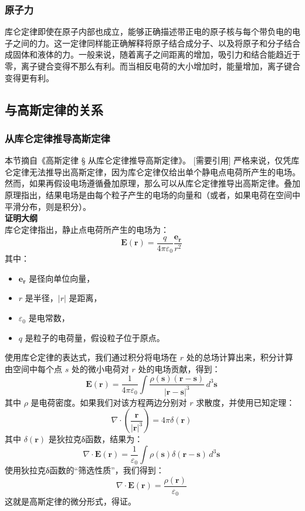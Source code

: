 \subsubsection{原子力}    
库仑定律即使在原子内部也成立，能够正确描述带正电的原子核与每个带负电的电子之间的力。这一定律同样能正确解释将原子结合成分子、以及将原子和分子结合成固体和液体的力。一般来说，随着离子之间距离的增加，吸引力和结合能趋近于零，离子键合变得不那么有利。而当相反电荷的大小增加时，能量增加，离子键合变得更有利。
\subsection{与高斯定律的关系}
\subsubsection{从库仑定律推导高斯定律}  
本节摘自《高斯定律 § 从库仑定律推导高斯定律》。  
[需要引用] 严格来说，仅凭库仑定律无法推导出高斯定律，因为库仑定律仅给出单个静电点电荷所产生的电场。然而，如果再假设电场遵循叠加原理，那么可以从库仑定律推导出高斯定律。叠加原理指出，结果电场是由每个粒子产生的电场的向量和（或者，如果电荷在空间中平滑分布，则是积分）。\\
\textbf{证明大纲}\\
库仑定律指出，静止点电荷所产生的电场为：
\[
\mathbf{E}(\mathbf{r}) = \frac{q}{4 \pi \varepsilon_0} \frac{\mathbf{e_r}}{r^2}~
\]
其中：
\begin{itemize}
\item \(\mathbf{e_r}\) 是径向单位向量，
\item \(r\) 是半径，\(|r|\) 是距离，
\item \(\varepsilon_0\) 是电常数，
\item \(q\) 是粒子的电荷量，假设粒子位于原点。
\end{itemize}
使用库仑定律的表达式，我们通过积分将电场在 \(r\) 处的总场计算出来，积分计算由空间中每个点 \(s\) 处的微小电荷对 \(r\) 处的电场贡献，得到：
\[
\mathbf{E}(\mathbf{r}) = \frac{1}{4 \pi \varepsilon_0} \int \frac{\rho (\mathbf{s}) (\mathbf{r} - \mathbf{s})}{|\mathbf{r} - \mathbf{s}|^3} \, d^3\mathbf{s}~
\]
其中 \(\rho\) 是电荷密度。如果我们对该方程两边分别对 \(r\) 求散度，并使用已知定理：
\[
\nabla \cdot \left( \frac{\mathbf{r}}{|\mathbf{r}|^3} \right) = 4 \pi \delta(\mathbf{r})~
\]
其中 \(\delta(\mathbf{r})\) 是狄拉克δ函数，结果为：
\[
\nabla \cdot \mathbf{E}(\mathbf{r}) = \frac{1}{\varepsilon_0} \int \rho(\mathbf{s}) \delta(\mathbf{r} - \mathbf{s}) \, d^3 \mathbf{s}~
\]
使用狄拉克δ函数的“筛选性质”，我们得到：
\[
\nabla \cdot \mathbf{E}(\mathbf{r}) = \frac{\rho(\mathbf{r})}{\varepsilon_0}~
\]
这就是高斯定律的微分形式，得证。

